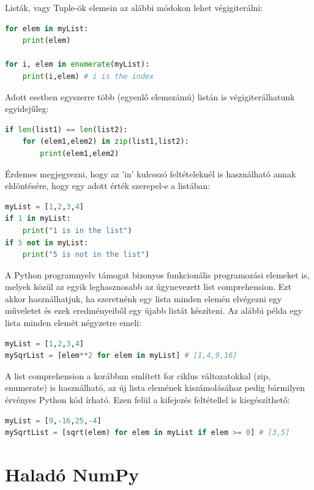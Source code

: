 \documentclass[12pt,a4paper,oneside]{report}             %
\begin{document}
Listák, vagy Tuple-ök elemein az alábbi módokon lehet végigiterálni:

\begin{lstlisting}[language=Python]
for elem in myList:
	print(elem)
	
for i, elem in enumerate(myList):
	print(i,elem) # i is the index
\end{lstlisting}

Adott esetben egyszerre több (egyenlő elemszámú) listán is végigiterálhatunk egyidejűleg:

\begin{lstlisting}[language=Python]
if len(list1) == len(list2):
	for (elem1,elem2) in zip(list1,list2):
		print(elem1,elem2)
\end{lstlisting}

Érdemes megjegyezni, hogy az 'in' kulcsszó feltételeknél is használható annak eldöntésére, hogy egy adott érték szerepel-e a listában:

\begin{lstlisting}[language=Python]
myList = [1,2,3,4]
if 1 in myList:
	print("1 is in the list")
if 5 not in myList:
	print("5 is not in the list")
\end{lstlisting}

A Python programnyelv támogat bizonyos funkcionális programozási elemeket is, melyek közül az egyik leghasznosabb az úgynevezett list comprehension. Ezt akkor használhatjuk, ha szeretnénk egy lista minden elemén elvégezni egy műveletet és ezek eredményeiből egy újabb listát készíteni. Az alábbi példa egy lista minden elemét négyzetre emeli:

\begin{lstlisting}[language=Python]
myList = [1,2,3,4]
mySqrList = [elem**2 for elem in myList] # [1,4,9,16]
\end{lstlisting}

A list comprehension a korábban említett for ciklus változatokkal (zip, enumerate) is használható, az új lista elemének kiszámolásához pedig bármilyen érvényes Python kód írható. Ezen felül a kifejezés feltétellel is kiegészíthető:

\begin{lstlisting}[language=Python]
myList = [9,-16,25,-4]
mySqrtList = [sqrt(elem) for elem in myList if elem >= 0] # [3,5]
\end{lstlisting}

\section{Haladó NumPy}
\end{document}
